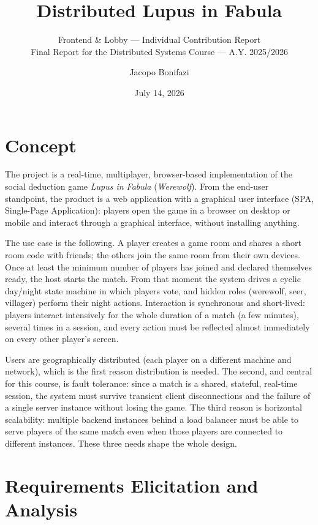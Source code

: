\documentclass{scrartcl}
\title{\LARGE
    Distributed Lupus in Fabula
}
\subtitle{Frontend \& Lobby --- Individual Contribution Report\\
    Final Report for the Distributed Systems Course --- A.Y. 2025/2026}
\author{
    Jacopo Bonifazi \\ \emailaddr{jacopo.bonifazi@studio.unibo.it}
}
\date{July 14, 2026}
\begin{document}
\maketitle


\section{Concept}\label{concept}

The project is a real-time, multiplayer, browser-based implementation of
the social deduction game \emph{Lupus in Fabula} (\emph{Werewolf}). From
the end-user standpoint, the product is a web application with a
graphical user interface (SPA, Single-Page Application): players open
the game in a browser on desktop or mobile and interact through a
graphical interface, without installing anything.

The use case is the following. A player creates a game room and shares a
short room code with friends; the others join the same room from their
own devices. Once at least the minimum number of players has joined and
declared themselves ready, the host starts the match. From that moment
the system drives a cyclic day/night state machine in which players
vote, and hidden roles (werewolf, seer, villager) perform their night
actions. Interaction is synchronous and short-lived: players interact
intensively for the whole duration of a match (a few minutes), several
times in a session, and every action must be reflected almost
immediately on every other player's screen.

Users are geographically distributed (each player on a different
machine and network), which is the first reason distribution is needed.
The second, and central for this course, is fault tolerance: since a
match is a shared, stateful, real-time session, the system must survive
transient client disconnections and the failure of a single server
instance without losing the game. The third reason is horizontal
scalability: multiple backend instances behind a load balancer must be
able to serve players of the same match even when those players are
connected to different instances. These three needs shape the whole
design.

\section{Requirements Elicitation and Analysis}\label{requirements}
\end{document}
